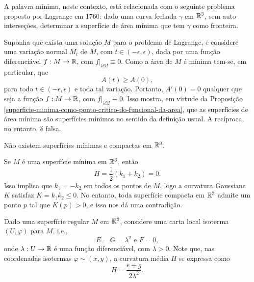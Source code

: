 A palavra mínima, neste contexto, está relacionada com o seguinte problema proposto por Lagrange em 1760: dado uma curva fechada $\gamma$ em $\mathbb{R}^3$, sem auto-interseções, determinar a superfície de área mínima que tem $\gamma$ como fronteira.

Suponha que exista uma solução $M$ para o problema de Lagrange, e considere uma variação normal $M_t$ de $M$, com $t \in (-\epsilon,\epsilon)$, dada por uma função diferenciável $f: M \rightarrow \mathbb{R}$, com $f \vert_{\partial M} \equiv 0$. Como a área de $M$ é mínima tem-se, em particular, que
\begin{equation*}
	A(t) \geq A(0),
\end{equation*}
para todo $t \in (-\epsilon,\epsilon)$ e toda tal variação. Portanto, $A'(0)=0$ qualquer que seja a função $f: M \rightarrow \mathbb{R}$, com $f \vert_{\partial M} \equiv 0$. Isso mostra, em virtude da Proposição \ref{superficie-minima-como-ponto-critico-do-funcional-da-area}, que as superfícies de área mínima são superfícies mínimas no sentido da definição usual. A recíproca, no entanto, é falsa.

\begin{proposicao}
	Não existem superfícies mínimas e compactas em $\mathbb{R}^3$.
\end{proposicao}

\begin{demonstracao}
	Se $M$ é uma superfície mínima em $\mathbb{R}^3$, então
	\begin{equation*}
		H = \frac{1}{2} (k_1 + k_2) = 0.
	\end{equation*}
	Isso implica que $k_1=-k_2$ em todos os pontos de $M$, logo a curvatura Gaussiana $K$ satisfaz $K = k_1 k_2 \leq 0$. No entanto, toda superfície compacta em $\mathbb{R}^3$ admite um ponto $p$ tal que $K(p)>0$, e isso nos dá uma contradição.
\end{demonstracao}

Dado uma superfície regular $M$ em $\mathbb{R}^3$, considere uma carta local isoterma $(U,\varphi)$ para $M$, i.e., 
\begin{equation*}
E = G = \lambda^2 \text{ e } F=0,
\end{equation*}
onde $\lambda: U \rightarrow \mathbb{R}$ é uma função diferenciável, com $\lambda > 0$. Note que, nas coordenadas isotermas $\varphi \sim (x,y)$, a curvatura média $H$ se expressa como
\begin{equation*}
H = \frac{e + g}{2 \lambda^2}.
\end{equation*}


